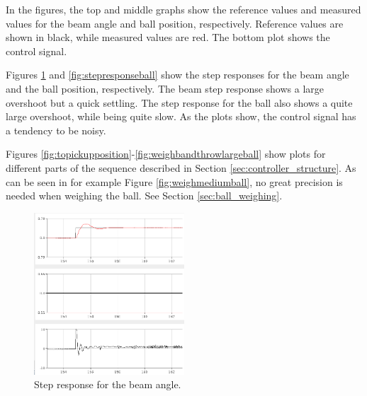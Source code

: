 
In the figures, the top and middle graphs show the reference values and measured values for the beam angle and ball position, respectively.
Reference values are shown in black, while measured values are red.
The bottom plot shows the control signal.

Figures \ref{fig:stepresponsebeam} and \ref{fig:stepresponseball} show the step responses for the beam angle and the ball position, respectively. 
The beam step response shows a large overshoot but a quick settling.
The step response for the ball also shows a quite large overshoot, while being quite slow.
As the plots show, the control signal has a tendency to be noisy.

Figures \ref{fig:topickupposition}-\ref{fig:weighbandthrowlargeball} show plots for different parts of the sequence described in Section \ref{sec:controller_structure}.
As can be seen in for example Figure \ref{fig:weighmediumball}, no great precision is needed when weighing the ball. See Section \ref{sec:ball_weighing}.

\begin{figure}[h]
\centering
\includegraphics[width=0.5\textwidth]{figures/stepresponsebeam-crop.png}
\caption{Step response for the beam angle.}
\label{fig:stepresponsebeam}
\end{figure}

